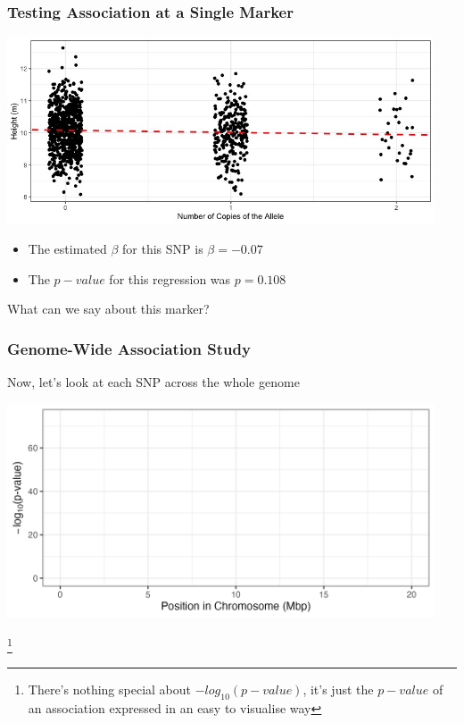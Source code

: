 \documentclass[xcolor=dvipsnames]{beamer}
\newcommand\blfootnote[1]{%
	\begingroup
	\renewcommand\thefootnote{}\footnote{#1}%
	\addtocounter{footnote}{-1}%
	\endgroup
}
\begin{document}
\begin{frame}
	\frametitle{Testing Association at a Single Marker}
	
	\includegraphics[keepaspectratio, width  = 0.95\textwidth]{img/snp_mod_line}				

\begin{itemize}
	\item[]	The estimated $\beta$ for this SNP is $\beta=-0.07$
	\item[] The $p-value$ for this regression was $p=0.108$
\end{itemize}
\pause 
\vspace{10pt}
\centering \Large What can we say about this marker?


\end{frame}


\begin{frame}
	\frametitle{Genome-Wide Association Study}
	Now, let's look at each SNP across the whole genome \pause
	
		\includegraphics[keepaspectratio, width  = 0.95\textwidth]{img/uncorPlot_noData}				
		
\blfootnote{There's nothing special about $-log_{10}(p-value)$, it's just the $p-value$ of an association expressed in an easy to visualise way}
\end{frame}
\end{document}
